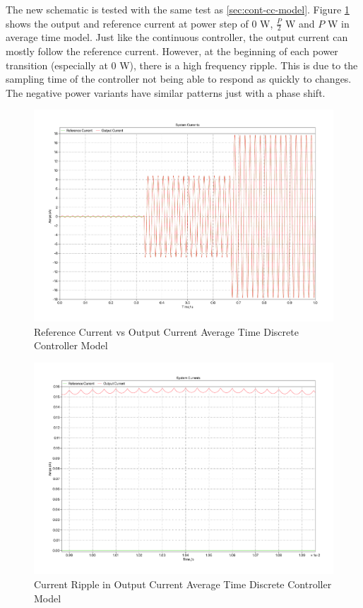 \documentclass[12pt]{article}
\begin{document}
The new schematic is tested with the same test as \ref{sec:cont-cc-model}.
Figure \ref{fig:avg-time-z-c-current} shows the output and reference current at power step of 0 W, $\frac{P}{2}$ W and $P$ W in average time model.
Just like the continuous controller, the output current can mostly follow the reference current.
However, at the beginning of each power transition (especially at 0 W), there is a high frequency ripple.
This is due to the sampling time of the controller not being able to respond as quickly to changes.
The negative power variants have similar patterns just with a phase shift.

\begin{figure}[ht]
    \centering{}
    \includegraphics[width=\textwidth, height=0.4\textheight, keepaspectratio]{img/Average Time Z-C Current.pdf}
    \caption{Reference Current vs Output Current Average Time Discrete Controller Model}
    \label{fig:avg-time-z-c-current}
\end{figure}

\begin{figure}[ht]
    \centering{}
    \includegraphics[width=\textwidth, height=0.4\textheight, keepaspectratio]{img/Average Time Z-C Ripple.pdf}
    \caption{Current Ripple in Output Current Average Time Discrete Controller Model}
    \label{fig:avg-time-z-c-current-ripple}
\end{figure}
\end{document}
